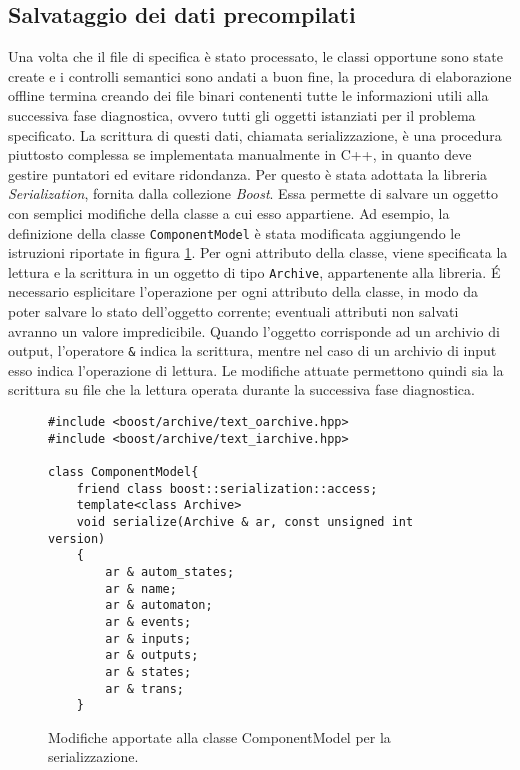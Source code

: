 \subsection{Salvataggio dei dati precompilati}
Una volta che il file di specifica è stato processato, le classi opportune sono state create e i controlli semantici sono andati a buon fine, la procedura di elaborazione offline termina creando dei file binari contenenti tutte le informazioni utili alla successiva fase diagnostica, ovvero tutti gli oggetti istanziati per il problema specificato. La scrittura di questi dati, chiamata serializzazione, è una procedura piuttosto complessa se implementata manualmente in C++, in quanto deve gestire puntatori ed evitare ridondanza. Per questo è stata adottata la libreria \emph{Serialization}, fornita dalla collezione \emph{Boost}\cite{web:boost}. Essa permette di salvare un oggetto con semplici modifiche della classe a cui esso appartiene.
Ad esempio, la definizione della classe \verb|ComponentModel| è stata modificata aggiungendo le istruzioni riportate in figura \ref{code:serialize}. Per ogni attributo della classe, viene specificata la lettura e la scrittura in un oggetto di tipo \verb|Archive|, appartenente alla libreria. \'E necessario esplicitare l'operazione per ogni attributo della classe, in modo da poter salvare lo stato dell'oggetto corrente; eventuali attributi non salvati avranno un valore impredicibile. Quando l'oggetto corrisponde ad un archivio di output, l'operatore \verb|&| indica la scrittura, mentre nel caso di un archivio di input esso indica l'operazione di lettura. Le modifiche attuate permettono quindi sia la scrittura su file che la lettura operata durante la successiva fase diagnostica.

\begin{figure}[htbp]
\begin{verbatim}
#include <boost/archive/text_oarchive.hpp>
#include <boost/archive/text_iarchive.hpp>

class ComponentModel{
    friend class boost::serialization::access;
    template<class Archive>
    void serialize(Archive & ar, const unsigned int version)
    {
        ar & autom_states;
        ar & name;
        ar & automaton;
        ar & events;
        ar & inputs;
        ar & outputs;
        ar & states;
        ar & trans;
    }
\end{verbatim}
\caption{Modifiche apportate alla classe ComponentModel per la serializzazione.}
\label{code:serialize}
\end{figure}

